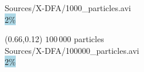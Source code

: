 {\begin{textblock}{0.28}
{Sources/X-DFA/1000_particles.avi}
\\
\vspace{1cm}
\colorbox{lightblue}{
2\%}
\end{textblock}

\begin{textblock}{0.28}(0.66,0.12)
\centering
$100\,000$ particles\\[0.1cm]

{Sources/X-DFA/100000_particles.avi}
\\
\vspace{1cm}
\colorbox{lightblue}{
2\%}\\[0.1cm]


\end{textblock}}
